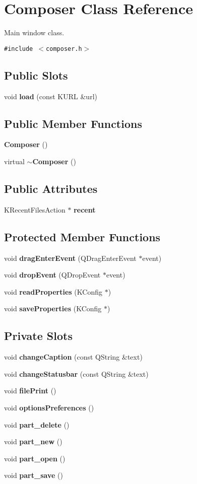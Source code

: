 \section{Composer Class Reference}
\label{classComposer}
Main window class.  


{\tt \#include $<$composer.h$>$}

\subsection*{Public Slots}
\begin{CompactItemize}
\item 
void {\bf load} (const KURL \&url)
\end{CompactItemize}
\subsection*{Public Member Functions}
\begin{CompactItemize}
\item 
{\bf Composer} ()
\item 
virtual {\bf $\sim$Composer} ()
\end{CompactItemize}
\subsection*{Public Attributes}
\begin{CompactItemize}
\item 
KRecent\-Files\-Action $\ast$ {\bf recent}
\end{CompactItemize}
\subsection*{Protected Member Functions}
\begin{CompactItemize}
\item 
void {\bf drag\-Enter\-Event} (QDrag\-Enter\-Event $\ast$event)
\item 
void {\bf drop\-Event} (QDrop\-Event $\ast$event)
\item 
void {\bf read\-Properties} (KConfig $\ast$)
\item 
void {\bf save\-Properties} (KConfig $\ast$)
\end{CompactItemize}
\subsection*{Private Slots}
\begin{CompactItemize}
\item 
void {\bf change\-Caption} (const QString \&text)
\item 
void {\bf change\-Statusbar} (const QString \&text)
\item 
void {\bf file\-Print} ()
\item 
void {\bf options\-Preferences} ()
\item 
void {\bf part\_\-delete} ()
\item 
void {\bf part\_\-new} ()
\item 
void {\bf part\_\-open} ()
\item 
void {\bf part\_\-save} ()
\end{CompactItemize}
